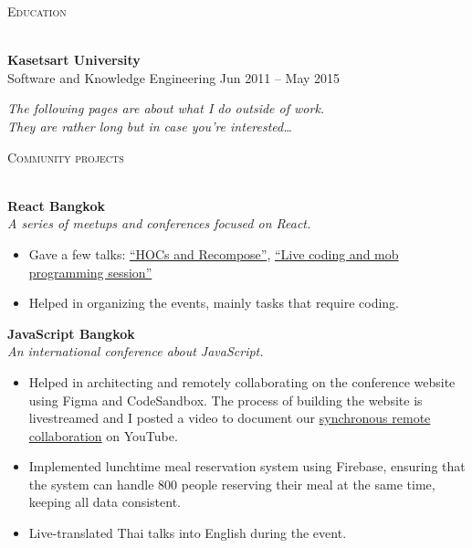\documentclass[a4paper]{article}
\newcommand{\lineunder} {
    \vspace*{-8pt} \\
    \hspace*{-18pt} \hrulefill \\
}
\newcommand{\header} [1] {
    {\hspace*{-18pt}\vspace*{6pt} \textsc{#1}}
    \vspace*{-6pt} \lineunder
}
\begin{document}
\header{Education}
\vspace{1mm}

\textbf{Kasetsart University}\\
Software and Knowledge Engineering \hfill Jun 2011 – May 2015\\
\vspace{2mm}



\newpage

\begin{center}
    \textit{The following pages are about what I do outside of work. \\ They are rather long but in case you’re interested…}
\end{center}
\vspace{3mm}






\header{Community projects}
\vspace{1mm}

\textbf{React Bangkok}\\
\textit{A series of meetups and conferences focused on React.}

\begin{itemize} \itemsep 1pt
    
	\item Gave a few talks: \href{https://dt.in.th/higher-order-components-and-recompose-talk.html}{“HOCs and Recompose”}, \href{https://dt.in.th/reactbkk2-live-coding.html}{“Live coding and mob programming session”}
    
	\item Helped in organizing the events, mainly tasks that require coding.
    
\end{itemize}

\vspace{2mm}

\textbf{JavaScript Bangkok}\\
\textit{An international conference about JavaScript.}

\begin{itemize} \itemsep 1pt
    
	\item Helped in architecting and remotely collaborating on the conference website using Figma and CodeSandbox. The process of building the website is livestreamed and I posted a video to document our \href{https://youtu.be/watch?v=uQH2R-BE1lw}{synchronous remote collaboration} on YouTube.
    
	\item Implemented lunchtime meal reservation system using Firebase, ensuring that the system can handle 800 people reserving their meal at the same time, keeping all data consistent.
    
	\item Live-translated Thai talks into English during the event.
    
\end{itemize}
\end{document}
